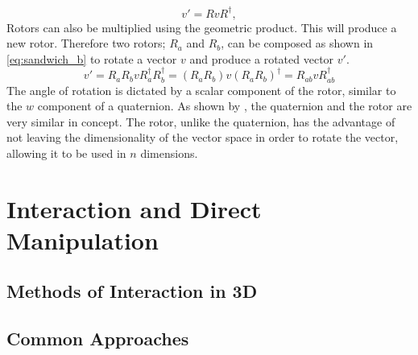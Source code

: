 \documentclass{l4proj}
\begin{document}
%
\begin{equation}
  \label{eq:sandwich_a}
    v' = R v R^\dagger,
\end{equation}
%
Rotors can also be multiplied using the geometric product. This will produce a new rotor. Therefore two rotors; $R_a$ and $R_b$, can be composed as shown in \cref{eq:sandwich_b} to rotate a vector \(v\) and produce a rotated vector \(v'\).
%
\begin{equation}
  \label{eq:sandwich_b}
  v' = R_a R_b v R_a^{\dagger} R_b^{\dagger}
   = (R_a R_b) v (R_a R_b)^{\dagger}
   = R_{ab}^{} v R_{ab}^{\dagger}
\end{equation}
%
The angle of rotation is dictated by a scalar component of the rotor, similar to the \(w\) component of a quaternion. 
As shown by \citep{bosch_code_nodate}, the quaternion and the rotor are very similar in concept. The rotor, unlike the quaternion, has the advantage of not leaving the dimensionality of the vector space in order to rotate the vector, allowing it to be used in \(n\) dimensions.

\section{Interaction and Direct Manipulation}
\label{background_rotation}

\subsection{Methods of Interaction in 3D}

\subsection*{Common Approaches}
\end{document}
